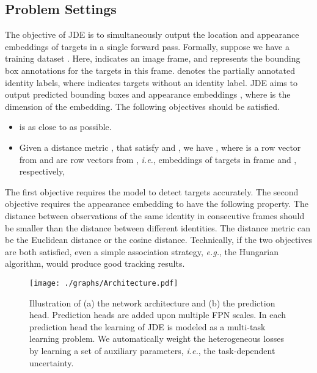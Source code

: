 \documentclass[runningheads]{llncs}
\def\ie{\textit{i.e.}}
\begin{document}
\subsection{Problem Settings}
\label{sec:problemdef}
The objective of JDE is to simultaneously output the location and appearance embeddings of targets in a single forward pass. Formally, suppose we have a training dataset . Here,  indicates an image frame, and  represents the bounding box annotations for the  targets in this frame.  denotes the partially annotated identity labels, where  indicates targets without an identity label. JDE aims to output predicted bounding boxes  and appearance embeddings , where  is the dimension of the embedding. The following objectives should be satisfied.
\begin{itemize}
    \item  is as close to  as possible.
    \item Given a distance metric ,  that satisfy  and   , we have , where  is a row vector from  and  are row vectors from , \ie, embeddings of targets in frame  and , respectively, 
\end{itemize}

The first objective requires the model to detect targets accurately. The second objective requires the appearance embedding to have the following property. The distance between observations of the same identity in consecutive frames should be smaller than the distance between different identities. The distance metric  can be the Euclidean distance or the cosine distance. Technically, if the two objectives are both satisfied, even a simple association strategy, \emph{e.g.}, the Hungarian algorithm, would produce good tracking results.


\begin{figure}[t]
    \centering
    \texttt{[image: ./graphs/Architecture.pdf]}
    \caption{Illustration of (a) the network architecture and (b) the prediction head. Prediction heads are added upon multiple FPN scales. In each prediction head the learning of JDE is modeled as a multi-task learning problem. We automatically weight the heterogeneous losses by learning a set of auxiliary parameters, \ie, the task-dependent uncertainty.}
    \label{fig:architecture}
\end{figure}
\end{document}
